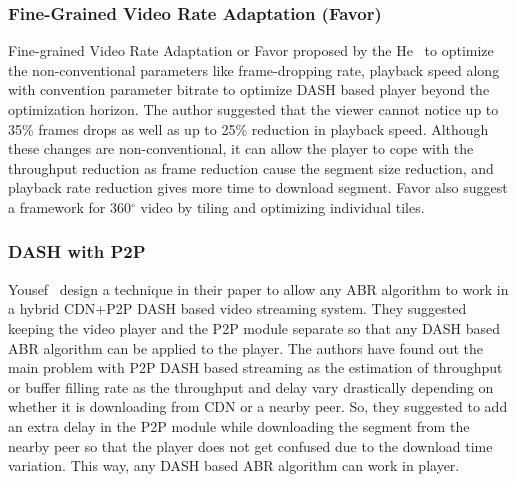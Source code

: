 \subsubsection{Fine-Grained Video Rate Adaptation (Favor)}
Fine-grained Video Rate Adaptation or Favor\cite{10.1145/3204949.3204957} proposed by the He \etal\ to optimize the non-conventional parameters like frame-dropping rate, playback speed along with convention parameter bitrate to optimize DASH based player beyond the optimization horizon. The author suggested that the viewer cannot notice up to 35\% frames drops as well as up to 25\% reduction in playback speed. Although these changes are non-conventional, it can allow the player to cope with the throughput reduction as frame reduction cause the segment size reduction, and playback rate reduction gives more time to download segment. Favor also suggest a framework for 360$^{\circ}$ video by tiling and optimizing individual tiles.

\subsubsection{DASH with P2P}
Yousef \etal\ design a technique in their paper \cite{10.1145/3339825.3391859} to allow any ABR algorithm to work in a hybrid CDN+P2P DASH based video streaming system. They suggested keeping the video player and the P2P module separate so that any DASH based ABR algorithm can be applied to the player. The authors have found out the main problem with P2P DASH based streaming as the estimation of throughput or buffer filling rate as the throughput and delay vary drastically depending on whether it is downloading from CDN or a nearby peer. So, they suggested to add an extra delay in the P2P module while downloading the segment from the nearby peer so that the player does not get confused due to the download time variation. This way, any DASH based ABR algorithm can work in player.


